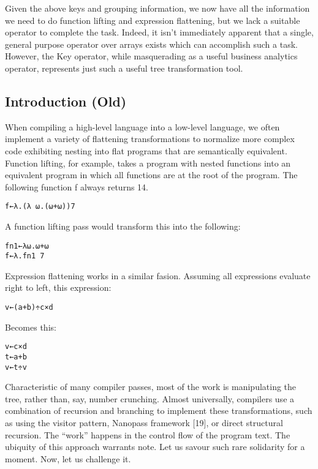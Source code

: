 \documentclass[pldi]{sigplanconf-pldi15}
\begin{document}
Given the above keys and grouping information, we now have all the information we need to do 
function lifting and expression flattening, but we lack a suitable operator to complete the task. 
Indeed, it isn’t immediately apparent that a single, general purpose operator over arrays exists 
which can accomplish such a task. However, the Key operator, while masquerading as a useful business 
analytics operator, represents just such a useful tree transformation tool. 
\subsection{Introduction (Old)}

When compiling a high-level language into a low-level language, we often implement a variety of 
flattening transformations to normalize more complex code exhibiting nesting into flat programs 
that are semantically equivalent. Function lifting, for example, takes a program with nested functions 
into an equivalent program in which all functions are at the root of the program. The following function
f always returns 14.

\begin{verbatim}
f←λ.(λ ⍵.(⍵+⍵))7
\end{verbatim}

A function lifting pass would transform this into the following:

\begin{verbatim}
fn1←λ⍵.⍵+⍵
f←λ.fn1 7
\end{verbatim}

Expression flattening works in a similar fasion. Assuming all expressions evaluate right to left, this expression:

\begin{verbatim}
v←(a+b)÷c×d
\end{verbatim}

Becomes this:

\begin{verbatim}
v←c×d
t←a+b
v←t÷v
\end{verbatim}

Characteristic of many compiler passes, most of the work is manipulating the tree, rather than, say, number 
crunching. Almost universally, compilers use a combination of recursion and branching to implement these 
transformations, such as using the visitor pattern, Nanopass framework [19], or direct structural recursion. 
The “work” happens in the control flow of the program text. The ubiquity of this approach warrants note. 
Let us savour such rare solidarity for a moment. Now, let us challenge it. 
\end{document}

